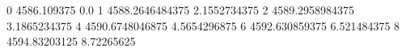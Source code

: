 0 4586.109375 0.0
1 4588.2646484375 2.1552734375
2 4589.2958984375 3.1865234375
4 4590.6748046875 4.5654296875
6 4592.630859375 6.521484375
8 4594.83203125 8.72265625
